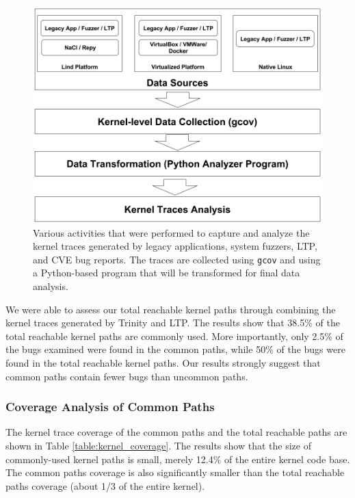 \begin{figure}%
\centering
\includegraphics[width=1.0\columnwidth]{diagram/data_collection.png}
\caption{Various activities that were performed to capture and analyze the kernel traces generated by legacy applications, system fuzzers, LTP, and CVE bug reports. The traces are collected using \texttt{gcov} and using a Python-based program that will be transformed for final data analysis.} 
\label{fig:datacollection}
\end{figure}



We were able to 
assess our total reachable kernel paths through combining the kernel traces generated by Trinity and LTP. The results show that 38.5\% of the total reachable
kernel paths are commonly used. 
More importantly, only 2.5\% of the bugs examined were found in the common
paths, 
while 50\% of the bugs were found in the total reachable kernel paths. 
Our results strongly suggest that common paths contain fewer bugs than uncommon
paths.  

\subsubsection{Coverage Analysis of Common Paths}

The kernel trace coverage of the common paths and the total reachable paths
are shown in Table \ref{table:kernel_coverage}. 
The results show that the size of commonly-used kernel paths is small,
merely 12.4\% of the entire kernel code base. 
The common paths coverage is also significantly smaller than the total
reachable paths coverage 
(about 1/3 of the entire kernel).


